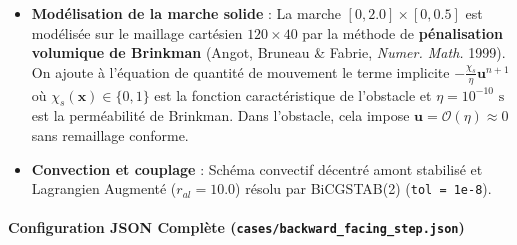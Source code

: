 \documentclass[
  10pt,
]{article}
\providecommand{\tightlist}{%
  \setlength{\itemsep}{0pt}\setlength{\parskip}{0pt}}
\begin{document}
\begin{itemize}
\tightlist
\item
  \textbf{Modélisation de la marche solide} : La marche
  \([0, 2.0] \times [0, 0.5]\) est modélisée sur le maillage cartésien
  \(120 \times 40\) par la méthode de \textbf{pénalisation volumique de
  Brinkman} (Angot, Bruneau \& Fabrie, \emph{Numer. Math.} 1999). On
  ajoute à l'équation de quantité de mouvement le terme implicite
  \(-\frac{\chi_s}{\eta} \mathbf{u}^{n+1}\) où
  \(\chi_s(\mathbf{x}) \in \{0, 1\}\) est la fonction caractéristique de
  l'obstacle et \(\eta = 10^{-10}\text{ s}\) est la perméabilité de
  Brinkman. Dans l'obstacle, cela impose
  \(\mathbf{u} = \mathcal{O}(\eta) \approx 0\) sans remaillage conforme.
\item
  \textbf{Convection et couplage} : Schéma convectif décentré amont
  stabilisé et Lagrangien Augmenté (\(r_{al} = 10.0\)) résolu par
  BiCGSTAB(2) (\texttt{tol\ =\ 1e-8}).
\end{itemize}

\paragraph{\texorpdfstring{Configuration JSON Complète
(\texttt{cases/backward\_facing\_step.json})}{Configuration JSON Complète (cases/backward\_facing\_step.json)}}\label{configuration-json-compluxe8te-casesbackward_facing_step.json}
\end{document}
